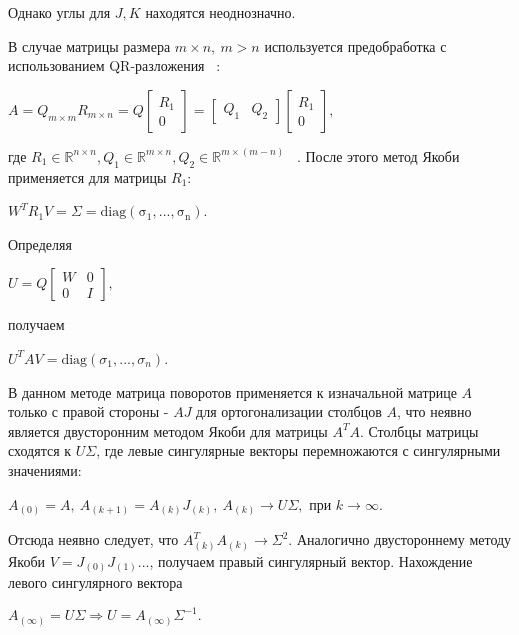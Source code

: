 Однако углы для $J, K$ находятся неоднозначно.

В случае матрицы размера $m \times n, \ m>n$ используется предобработка с использованием QR-разложения ~\cite{10.5555/867597}: 
\begin{center}
    $A = Q_{m\times m}R_{m\times n} = Q\begin{bmatrix}
        R_1\\0
    \end{bmatrix} = \begin{bmatrix}
        Q_1&Q_2
    \end{bmatrix}
    \begin{bmatrix}
        R_1\\0
    \end{bmatrix},
    $
\end{center}
где $R_1 \in \mathbb{R}^{n\times n}, Q_1 \in \mathbb{R}^{m\times n}, Q_2\in \mathbb{R}^{m\times (m-n)}$ ~\cite{Golub2013}. После этого метод Якоби применяется для матрицы $R_1$:
\begin{center}
    $W^TR_1V=\Sigma = \mathrm{diag(\sigma_1,...,\sigma_n)}$.
\end{center}
Определяя 
\begin{center}
    $U = Q\begin{bmatrix}
        W&0\\0&I
    \end{bmatrix},$    
\end{center}
получаем
\begin{center}
     $U^TAV = \mathrm{diag}(\sigma_1,...,\sigma_n)$.
\end{center}


В данном методе матрица поворотов применяется к изначальной матрице $A$ только с правой стороны - $AJ$ для ортогонализации столбцов $A$, что неявно является двусторонним методом Якоби для матрицы $A^TA$.
Столбцы матрицы сходятся к $U\Sigma$, где левые сингулярные векторы перемножаются с сингулярными значениями:
\begin{center}
     $A_{(0)}=A,\ A_{(k+1)} = A_{(k)}J_{(k)},\ A_{(k)} \longrightarrow U\Sigma, \text{ при } k\to\infty$.
 \end{center}
 Отсюда неявно следует, что $A^T_{(k)}A_{(k)} \to \Sigma^2$. Аналогично двустороннему методу Якоби $V = J_{(0)}J_{(1)}...$, получаем правый сингулярный вектор. Нахождение левого сингулярного вектора 
 \begin{center}
     $A_{(\infty)} = U\Sigma \Rightarrow U = A_{(\infty)}\Sigma^{-1}.$
 \end{center}

